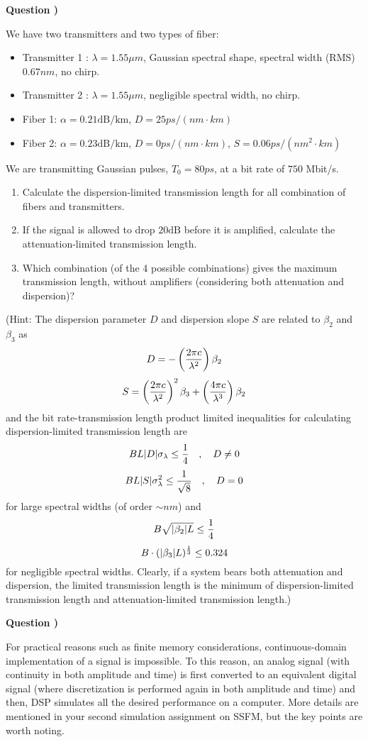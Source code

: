 \documentclass[10pt,letterpaper]{article}
\newcounter{QuestionNumber}
\newcommand{\Q}{
\textbf{Question \theQuestionNumber)}
\stepcounter{QuestionNumber}
}
\begin{document}
\Q

We have two transmitters and two types of fiber:

\begin{itemize}
\item
Transmitter 1 : $\lambda=1.55\mu m$, Gaussian spectral shape, spectral width (RMS) $0.67 nm$, no chirp.

\item
Transmitter 2 : $\lambda=1.55\mu m$, negligible spectral width, no chirp.

\item
Fiber 1: $\alpha=0.21 \text{dB}/\text{km}$, $D=25 ps/(nm\cdot km)$

\item
Fiber 2: $\alpha=0.23 \text{dB}/\text{km}$, $D=0 ps/(nm\cdot km)$, $S=0.06 ps/(nm^2\cdot km)$
\end{itemize}
We are transmitting Gaussian pulses, $T_0=80 ps$, at a bit rate of $750$ Mbit/s.
\begin{enumerate}[label=\alph*.]
\item
Calculate the dispersion-limited transmission length for all combination of fibers and transmitters.
\item
If the signal is allowed to drop $20\text{dB}$ before it is amplified, calculate the attenuation-limited transmission length.
\item
Which combination (of the 4 possible combinations) gives the maximum transmission length, without amplifiers (considering both attenuation and dispersion)?
\end{enumerate}
(Hint:
 The dispersion parameter $D$ and dispersion slope $S$ are related to $\beta_2$ and $\beta_3$ as
$$
D=-\left({2\pi c\over \lambda^2}\right)\beta_2
$$
$$
S=\left({2\pi c\over \lambda^2}\right)^2\beta_3+\left({4\pi c\over \lambda^3}\right)\beta_2
$$
and the bit rate-transmission length product limited inequalities for calculating dispersion-limited transmission length are
$$
BL|D|\sigma_\lambda\le{1\over 4}\quad,\quad D\ne 0
$$
$$
BL|S|\sigma_\lambda^2\le{1\over \sqrt8}\quad,\quad D= 0
$$
for large spectral widths (of order $\sim nm$) and 
$$
B\sqrt{|\beta_2| L}\le{1\over 4}
$$
$$
B\cdot(|\beta_3| L)^{1\over 3}\le{0.324}
$$
for negligible spectral widths. Clearly, if a system bears both attenuation and dispersion, the limited transmission length is the minimum of dispersion-limited transmission length and attenuation-limited transmission length.)

\Q

For practical reasons such as finite memory considerations, continuous-domain implementation of a signal is impossible. To this reason, an analog signal (with continuity in both amplitude and time) is first converted to an equivalent digital signal (where discretization is performed again in both amplitude and time) and then, DSP simulates all the desired performance on a computer. More details are mentioned in your second simulation assignment on SSFM, but the key points are worth noting.
\end{document}

